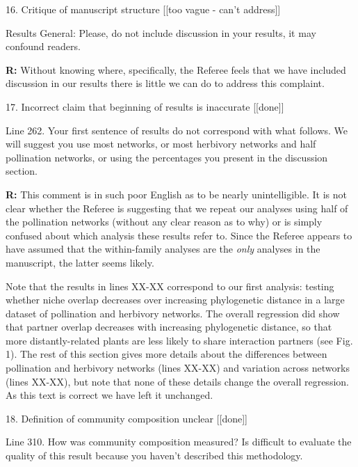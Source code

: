 \documentclass[12pt]{letter}
\newenvironment{refquote}{\bigskip \begin{it}}{\end{it}\smallskip}
\begin{document}
	16. Critique of manuscript structure [[too vague - can't address]]

		\begin{refquote}
			Results
			General: Please, do not include discussion in your results, it may confound readers.
		\end{refquote}

		\textbf{R:} Without knowing where, specifically, the Referee feels that we have included discussion in our results there is little we can do to address this complaint.


	17. Incorrect claim that beginning of results is inaccurate [[done]]

		\begin{refquote}
			Line 262. Your first sentence of results do not correspond with what follows. We will suggest you use most networks, or most herbivory networks and half pollination networks, or using the percentages you present in the discussion section.
		\end{refquote}

		\textbf{R:} This comment is in such poor English as to be nearly unintelligible. It is not clear whether the Referee is suggesting that we repeat our analyses using half of the pollination networks (without any clear reason as to why) or is simply confused about which analysis these results refer to. Since the Referee appears to have assumed that the within-family analyses are the \emph{only} analyses in the manuscript, the latter seems likely.


		Note that the results in lines XX-XX correspond to our first analysis: testing whether niche overlap decreases over increasing phylogenetic
		distance in a large dataset of pollination and herbivory networks. The overall regression did show that partner overlap decreases with increasing phylogenetic distance, so that more distantly-related plants are less likely to share interaction partners (see Fig. 1). The rest of this section gives more details about the differences between pollination and herbivory networks (lines XX-XX) and variation across networks (lines XX-XX), but note that none of these details change the overall regression. As this text is correct we have left it unchanged.


	18. Definition of community composition unclear [[done]]


		\begin{refquote}
			Line 310. How was community composition measured? Is difficult to evaluate the quality of this result because you haven't described this methodology.
		\end{refquote}
\end{document}
